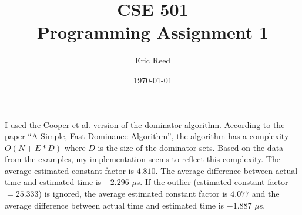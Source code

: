 \documentclass{article}
\author{Eric Reed}
\title{CSE 501\\ Programming Assignment 1}
\date{\today}
\begin{document}
\maketitle

I used the Cooper et al. version of the dominator algorithm.
According to the paper ``A Simple, Fast Dominance Algorithm'',
the algorithm has a complexity $O(N+E*D)$ where $D$ is the size of the dominator sets.
Based on the data from the examples, my implementation seems to reflect this complexity.
The average estimated constant factor is $4.810$. 
The average difference between actual time and estimated time is $-2.296$ $\mu$s.
If the outlier (estimated constant factor $= 25.333$) is ignored, the average estimated constant factor is $4.077$
and the average difference between actual time and estimated time is $-1.887$ $\mu$s.
\end{document}

